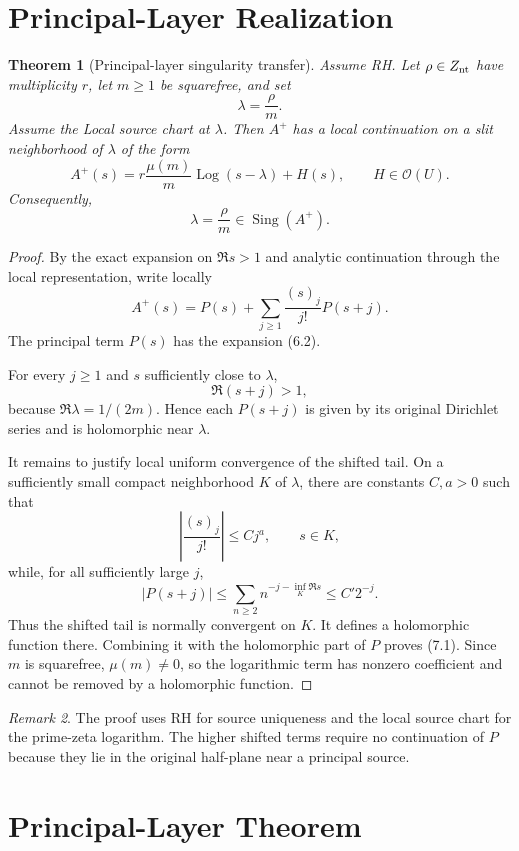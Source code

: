 \documentclass[11pt,a4paper]{article}
\newtheorem{theorem}{Theorem}[section]
\theoremstyle{remark}
\newtheorem{remark}[theorem]{Remark}
\newcommand{\Sing}{\operatorname{Sing}}
\newcommand{\Log}{\operatorname{Log}}
\begin{document}
\section{Principal-Layer Realization}

\begin{theorem}[Principal-layer singularity transfer]
Assume RH. Let $\rho\in Z_{\rm nt}$ have multiplicity $r$, let $m\ge1$ be squarefree, and set
\[
\lambda=\frac{\rho}{m}.
\]
Assume the Local source chart at $\lambda$. Then $A^+$ has a local continuation on a slit neighborhood of $\lambda$ of the form
\[
\boxed{A^+(s)=r\frac{\mu(m)}m\Log(s-\lambda)+H(s),\qquad H\in\mathcal O(U).}
\tag{7.1}
\]
Consequently,
\[
\boxed{\lambda=\frac{\rho}{m}\in\Sing(A^+).}
\tag{7.2}
\]
\end{theorem}

\begin{proof}
By the exact expansion on $\Re s>1$ and analytic continuation through the local representation, write locally
\[
A^+(s)=P(s)+\sum_{j\ge1}\frac{(s)_j}{j!}P(s+j).
\tag{7.3}
\]
The principal term $P(s)$ has the expansion (6.2).

For every $j\ge1$ and $s$ sufficiently close to $\lambda$,
\[
\Re(s+j)>1,
\]
because $\Re\lambda=1/(2m)$. Hence each $P(s+j)$ is given by its original Dirichlet series and is holomorphic near $\lambda$.

It remains to justify local uniform convergence of the shifted tail. On a sufficiently small compact neighborhood $K$ of $\lambda$, there are constants $C,a>0$ such that
\[
\left|\frac{(s)_j}{j!}\right|\le Cj^a,
\qquad s\in K,
\]
while, for all sufficiently large $j$,
\[
|P(s+j)|\le \sum_{n\ge2}n^{-j-\inf_K\Re s}\le C'2^{-j}.
\]
Thus the shifted tail is normally convergent on $K$. It defines a holomorphic function there. Combining it with the holomorphic part of $P$ proves (7.1). Since $m$ is squarefree, $\mu(m)\ne0$, so the logarithmic term has nonzero coefficient and cannot be removed by a holomorphic function.
\end{proof}

\begin{remark}
The proof uses RH for source uniqueness and the local source chart for the prime-zeta logarithm. The higher shifted terms require no continuation of $P$ because they lie in the original half-plane near a principal source.
\end{remark}

\section{Principal-Layer Theorem}
\end{document}
